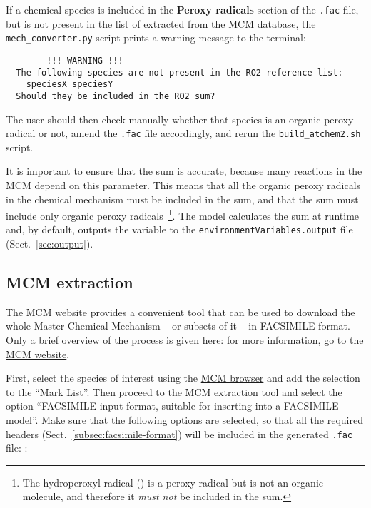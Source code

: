 If a chemical species is included in the \textbf{Peroxy radicals}
section of the \texttt{.fac} file, but is not present in the list of
 extracted from the MCM database, the \texttt{mech\_converter.py}
script prints a warning message to the terminal:

\begin{verbatim}
        !!! WARNING !!!
  The following species are not present in the RO2 reference list:
    speciesX speciesY
  Should they be included in the RO2 sum?
\end{verbatim}

The user should then check manually whether that species is an organic
peroxy radical or not, amend the \texttt{.fac} file accordingly, and
rerun the \texttt{build\_atchem2.sh} script.

It is important to ensure that the  sum is accurate, because
many reactions in the MCM depend on this parameter. This means that
all the organic peroxy radicals in the chemical mechanism must be
included in the  sum, and that the  sum must include
only organic peroxy radicals~\footnote{The hydroperoxyl radical
  () is a peroxy radical but is not an organic molecule, and
  therefore it \emph{must not} be included in the  sum.}. The
model calculates the  sum at runtime and, by default, outputs
the variable to the \texttt{environmentVariables.output} file
(Sect.~\ref{sec:output}).

\subsection{MCM extraction} \label{subsec:mcm-extraction}

The MCM website provides a convenient tool that can be used to
download the whole Master Chemical Mechanism -- or subsets of it -- in
FACSIMILE format. Only a brief overview of the process is given here:
for more information, go to the \href{https://mcm.york.ac.uk/MCM/}{MCM website}.

First, select the species of interest using the
\href{https://mcm.york.ac.uk/MCM/browse}{MCM browser} and add the
selection to the ``Mark List''. Then proceed to the
\href{https://mcm.york.ac.uk/MCM/export}{MCM extraction tool} and
select the option ``FACSIMILE input format, suitable for inserting
into a FACSIMILE model''. Make sure that the following options are
selected, so that all the required headers
(Sect.~\ref{subsec:facsimile-format}) will be included in the
generated \texttt{.fac} file: :

